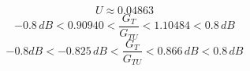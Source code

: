 \[
	U \approx	0.04863
\]
\[
-0.8 \,dB < 0.90940 < \frac{G_T}{G_{TU}} < 1.10484 < 0.8 \,dB
\]
\[
-0.8 dB < -0.825 \,dB< \frac{G_T}{G_{TU}} < 0.866 \,dB< 0.8 \,dB
\]
